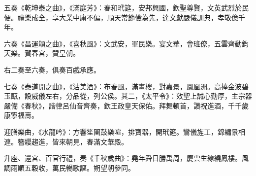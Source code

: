 五奏《乾坤泰之曲》，《滿庭芳》：春和玳筵，安邦興國，欽聖尊賢，文英武烈於民便。禮樂成全，享大業中庸不偏，順天常節儉為先，達文獻嚴儀訓典，孝敬億千年。

六奏《昌運頌之曲》，《喜秋風》：文武安，軍民樂。宴文華，會班僚，五雲齊動鈞天樂。賀春宮，贊皇朝。

右二奏至六奏，俱奏百戲承應。

七奏《泰道開之曲》，《沽美酒》：布春風，滿畫樓，對嘉景，鳳凰洲。高捧金波碧玉甌，設威儀左右，分品從，列公侯。其二，《太平令》：效聖上誠心勤厚，主宗器嚴備《春秋》，諧律呂仙音齊奏，欽王政皇天保佑。拜舞頓首，讚祝進酒，千千歲康寧福壽。

迎膳樂曲，《水龍吟》：方響笙闉鼓樂喧，排寶器，開玳筵。鸞儀旌工，錦繡景相連。簪纓趨進，皆來朝見，春滿文華殿。

升座、還宮、百官行禮，奏《千秋歲曲》：堯年舜日勝禹周，慶雲生繚繞鳳樓。風調雨順五穀收，萬民暢歌謳。朔望朝參同。
